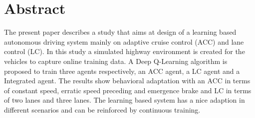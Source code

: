 \begin{sloppypar}
\section{Abstract}


The present paper describes a study that aims at design of a learning based autonomous driving system mainly on adaptive cruise control (ACC) and lane control (LC). In this study a simulated highway environment is created for the vehicles to capture online training data. A Deep Q-Learning algorithm is proposed to train three agents respectively, an ACC agent, a LC agent and a Integrated agent. The results show behavioral adaptation with an ACC in terms of constant speed, erratic speed preceding and emergence brake and LC in terms of two lanes and three lanes. The learning based system has a nice adaption in different scenarios and can be reinforced by continuous training.

\newpage
\end{sloppypar}
%
%
